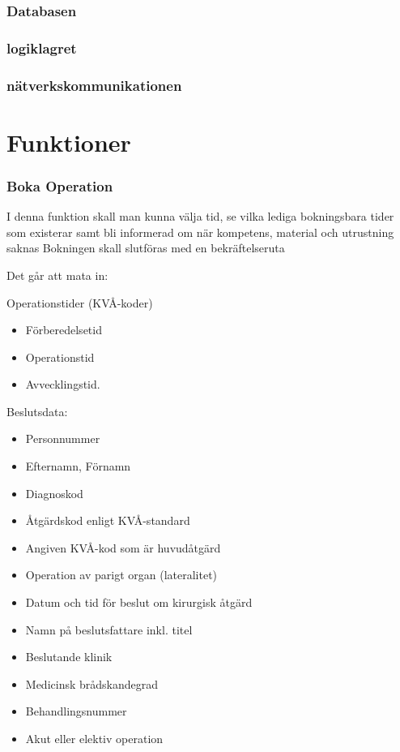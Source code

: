 \documentclass[a4paper,10pt]{article}
\begin{document}
        \subsubsection{Databasen}
        \subsubsection{logiklagret}
        \subsubsection{nätverkskommunikationen}
        
\section{Funktioner}

    \subsubsection{Boka Operation}

I denna funktion skall man kunna välja tid, se vilka lediga bokningsbara tider som existerar samt bli informerad om när kompetens, material och utrustning saknas
Bokningen skall slutföras med en bekräftelseruta

Det går att mata in:

Operationstider (KVÅ-koder)
\begin{itemize}
	\item Förberedelsetid
	\item Operationstid
	\item Avvecklingstid.
\end{itemize}

Beslutsdata:

\begin{itemize}
	\item Personnummer
	\item Efternamn, Förnamn
	\item Diagnoskod
	\item Åtgärdskod enligt KVÅ-standard
	\item Angiven KVÅ-kod som är huvudåtgärd
	\item Operation av parigt organ (lateralitet)
	\item Datum och tid för beslut om kirurgisk åtgärd
	\item Namn på beslutsfattare inkl. titel
	\item Beslutande klinik
	\item Medicinsk brådskandegrad
	\item Behandlingsnummer
	\item Akut eller elektiv operation

\end{itemize}
\end{document}
